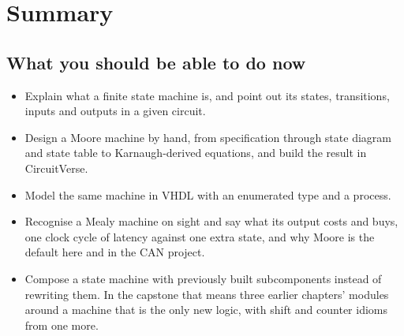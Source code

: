 
\section{Summary}
\label{c8:sec:review}

\subsection*{What you should be able to do now}
\begin{itemize}
  \item Explain what a finite state machine is, and point out its states, transitions, inputs and
    outputs in a given circuit.
  \item Design a Moore machine by hand, from specification through state diagram and state table to
    Karnaugh-derived equations, and build the result in CircuitVerse.
  \item Model the same machine in VHDL with an enumerated type  and a 
    process.
  \item Recognise a Mealy machine on sight and say what its output costs and buys, one clock cycle
    of latency against one extra state, and why Moore is the default here and in the CAN project.
  \item Compose a state machine with previously built subcomponents instead of rewriting them. In
    the capstone that means three earlier chapters' modules around a machine that is the only new
    logic, with shift and counter idioms from one more.
\end{itemize}

